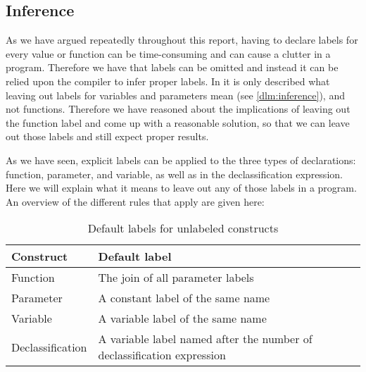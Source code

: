 \subsection{Inference}
As we have argued repeatedly throughout this report, having to declare labels for every value or function can be time-consuming and can cause a clutter in a program.
Therefore we have that labels can be omitted and instead it can be relied upon the compiler to infer proper labels.
In \cite{myers1997} it is only described what leaving out labels for variables and parameters mean (see \cref{dlm:inference}), and not functions.
Therefore we have reasoned about the implications of leaving out the function label and come up with a reasonable solution, so that we can leave out those labels and still expect proper results.

As we have seen, explicit labels can be applied to the three types of declarations: function, parameter, and variable, as well as in the declassification expression.
Here we will explain what it means to leave out any of those labels in a program.
An overview of the different rules that apply are given here:
\begin{table}[H]
  \begin{tabularx}{\textwidth}{|l|X|}
    \hline
    \textbf{Construct} & \textbf{Default label} \\ \hline \hline
    Function & The join of all parameter labels \\ \hline
    Parameter & A constant label of the same name \\ \hline
    Variable & A variable label of the same name \\ \hline
    Declassification & A variable label named after the number of declassification expression\\ \hline
  \end{tabularx}
  \caption{Default labels for unlabeled constructs}
  \label{informal:table:default_labels}
\end{table}

